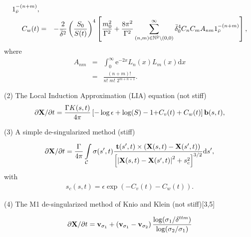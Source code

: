 \begin{list}{dummy}
\begin{list}{dummy}
\begin{eqnarray}
                              1_{\bar \nu}^{-(n+m)}
                                           ,\nonumber\\
        C_w(t)&=&-\frac{2}{\bar{\delta}^2}
       \left(\frac{S_0}{S(t)}\right)^4
        \left[
                  \frac{m_0^2}{\Gamma^2}
             +\frac{8\pi^2}{\Gamma^2}
     \sum_{(n,m)\in {\Bbb{N}}^2\backslash(0,0)}^{\infty}
             \bar{\delta}_0^4C_nC_mA_{nm}
                 1_{\bar \nu}^{-(n+m)}\right],\nonumber 
\end{eqnarray}
%           
where
%
\begin{eqnarray} 
   A_{nm}&=&\int_0^{\infty}\mbox{e}^{-2x}L_n(x)L_m(x)\mbox{d}x
                \nonumber\\
           &=&\frac{(n+m)!}{n!\mbox{~}m!\mbox{~}2^{m+n+1}}.
                  \nonumber
\end{eqnarray}
%


\end{list}


\item[(2)] The Local Induction Approximation (LIA) equation  (not stiff)
	\begin{eqnarray}
	\label{eCT1}
		\partial{ \mbox{\bf X}}/\partial{t}={\Gamma K(s,t) \over{4\pi}}\left[{-\log\epsilon+\log(S)-1}
		{+C_v(t)+C_w(t)}\right]\mbox{\bf b}(s,t),
        \end{eqnarray} 

\item[(3)] A simple de-singularized method (stiff)

	\begin{eqnarray}
	\label{Burger}
 		\partial{ \mbox{\bf X}}/\partial{t}=
		{\Gamma\over{4\pi}} \int\limits_{{\cal{C}}} \sigma(s',t)
		{\mbox{\bf t}(s',t)\times\left(\mbox{\bf X}(s,t)-\mbox{\bf X}(s',t)\right)
		\over{\left[\left| \mbox{\bf X}(s,t)- \mbox{\bf X}(s',t)\right|^2+s_{c}^2\right]}^{3/2}}\mbox{d}s',
       \end{eqnarray}
with
      \begin{eqnarray}
	\label{loi2}
    		 s_c(s,t)=\epsilon\exp\left({-C_v(t)-C_w(t)}\right).
        \end{eqnarray}


\item[(4)] The M1 de-singularized method of Knio and Klein (not stiff)[3,5]

	\begin{eqnarray}
	\label{M1}
 		\partial{ \mbox{\bf X}}/\partial{t}=\mbox{\bf v}_{\sigma_1}+\left(\mbox{\bf v}_{\sigma_1}-\mbox{\bf v}_{\sigma_2}\right)
                             \frac{\log(\sigma_1/\delta^{ttm})}{\log(\sigma_2/\sigma_1)}
       \end{eqnarray}


\end{list}
